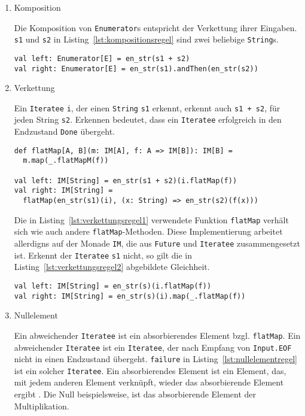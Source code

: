 \begin{enumerate}
  \item Komposition

    Die Komposition von \lstinline|Enumerator|s entspricht der Verkettung ihrer Eingaben.
    \lstinline|s1| und \lstinline|s2| in Listing~\ref{lst:kompositionsregel} sind zwei beliebige \lstinline|String|s.

    \begin{lstlisting}[caption=Kompositionsregel, label=lst:kompositionsregel]
val left: Enumerator[E] = en_str(s1 + s2)
val right: Enumerator[E] = en_str(s1).andThen(en_str(s2))
    \end{lstlisting}

  \item Verkettung

    Ein \lstinline|Iteratee| \lstinline|i|, der einen \lstinline|String| \lstinline|s1| erkennt, erkennt auch \lstinline|s1 + s2|, für jeden String \lstinline|s2|.
    Erkennen bedeutet, dass ein \lstinline|Iteratee| erfolgreich in den Endzustand \lstinline|Done| übergeht.

    \begin{lstlisting}[caption={Verkettungsregel, wenn ein Iteratee die Eingabe erkennt}, label=lst:verkettungsregel1]
def flatMap[A, B](m: IM[A], f: A => IM[B]): IM[B] =
  m.map(_.flatMapM(f))

val left: IM[String] = en_str(s1 + s2)(i.flatMap(f))
val right: IM[String] =
  flatMap(en_str(s1)(i), (x: String) => en_str(s2)(f(x)))
    \end{lstlisting}

    Die in Listing~\ref{lst:verkettungsregel1} verwendete Funktion \lstinline|flatMap| verhält sich wie auch andere \lstinline|flatMap|-Methoden.
    Diese Implementierung arbeitet allerdigns auf der Monade \lstinline|IM|, die aus \lstinline|Future| und \lstinline|Iteratee| zusammengesetzt ist.
    Erkennt der \lstinline|Iteratee| \lstinline|s1| nicht, so gilt die in Listing~\ref{lst:verkettungsregel2} abgebildete Gleichheit.

    \begin{lstlisting}[caption={Verkettungsregel, wenn ein Iteratee die Eingabe nicht erkennt}, label=lst:verkettungsregel2]
val left: IM[String] = en_str(s)(i.flatMap(f))
val right: IM[String] = en_str(s)(i).map(_.flatMap(f))
    \end{lstlisting}

  \item Nullelement

    Ein abweichender \lstinline|Iteratee| ist ein absorbierendes Element bzgl. \lstinline|flatMap|.
    Ein abweichender \lstinline|Iteratee| ist ein \lstinline|Iteratee|, der nach Empfang von \lstinline|Input.EOF| nicht in einen Endzustand übergeht.
    \lstinline|failure| in Listing~\ref{lst:nullelementregel} ist ein solcher \lstinline|Iteratee|.
    Ein absorbierendes Element ist ein Element, das, mit jedem anderen Element verknüpft, wieder das absorbierende Element ergibt \cite[vgl.][S.~15]{absorbing_element}.
    Die Null beispielsweise, ist das absorbierende Element der Multiplikation.


\end{enumerate}
